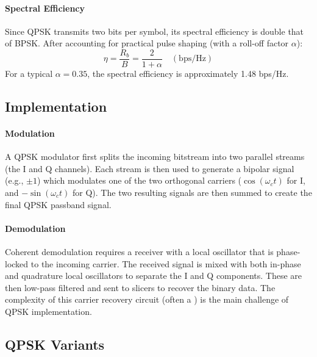 \paragraph{Spectral Efficiency}
Since QPSK transmits two bits per symbol, its spectral efficiency is double that of BPSK. After accounting for practical pulse shaping (with a roll-off factor $\alpha$):
\begin{equation}
    \eta = \frac{R_b}{B} = \frac{2}{1+\alpha} \quad (\text{bps/Hz})
\end{equation}
For a typical $\alpha=0.35$, the spectral efficiency is approximately 1.48 bps/Hz.


\subsection{Implementation}

\paragraph{Modulation}
A QPSK modulator first splits the incoming bitstream into two parallel streams (the I and Q channels). Each stream is then used to generate a bipolar signal (e.g., $\pm1$) which modulates one of the two orthogonal carriers ($\cos(\omega_c t)$ for I, and $-\sin(\omega_c t)$ for Q). The two resulting signals are then summed to create the final QPSK passband signal.

\paragraph{Demodulation}
Coherent demodulation requires a receiver with a local oscillator that is phase-locked to the incoming carrier. The received signal is mixed with both in-phase and quadrature local oscillators to separate the I and Q components. These are then low-pass filtered and sent to slicers to recover the binary data. The complexity of this carrier recovery circuit (often a ) is the main challenge of QPSK implementation.


\subsection{QPSK Variants}

